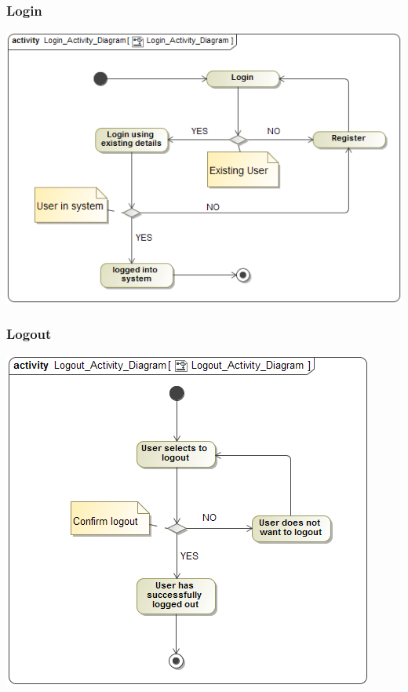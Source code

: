 \documentclass[11pt]{article}
\begin{document}
	\newpage
	\subsubsection{Login}
	\begin{center}
		\includegraphics[width=\textwidth]{../Images/Login_Activity_Diagram.png}\\[0.5cm]
	\end{center}
	
	\newpage
	\subsubsection{Logout}
	\begin{center}
		\includegraphics[width=\textwidth]{../Images/Logout_Activity_Diagram.png}\\[0.5cm]
	\end{center}
\end{document}

